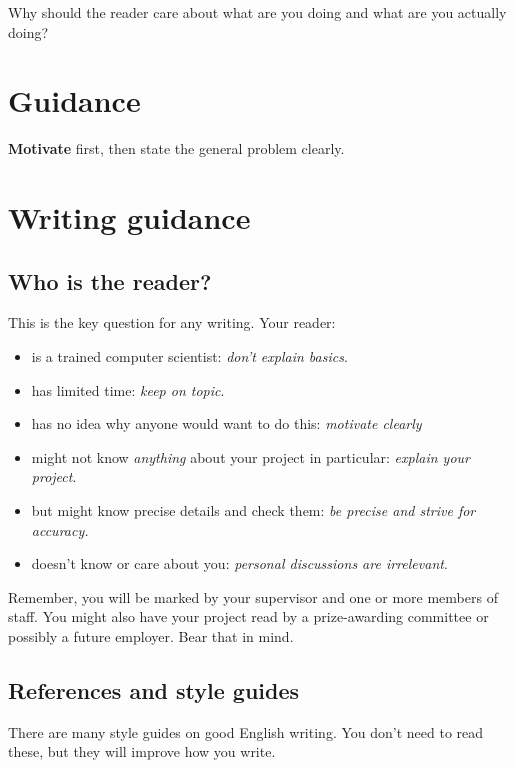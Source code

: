 \documentclass{l4proj}
\begin{document}


Why should the reader care about what are you doing and what are you actually doing?
\section{Guidance}

\textbf{Motivate} first, then state the general problem clearly. 

\section{Writing guidance}
\subsection{Who is the reader?}

This is the key question for any writing. Your reader:

\begin{itemize}
    \item
    is a trained computer scientist: \emph{don't explain basics}.
    \item
    has limited time: \emph{keep on topic}.
    \item
    has no idea why anyone would want to do this: \emph{motivate clearly}
    \item
    might not know \emph{anything} about your project in particular:
    \emph{explain your project}.
    \item
    but might know precise details and check them: \emph{be precise and
    strive for accuracy.}
    \item
    doesn't know or care about you: \emph{personal discussions are
    irrelevant}.
\end{itemize}

Remember, you will be marked by your supervisor and one or more members
of staff. You might also have your project read by a prize-awarding
committee or possibly a future employer. Bear that in mind.

\subsection{References and style guides}
There are many style guides on good English writing. You don't need to
read these, but they will improve how you write.
\end{document}
